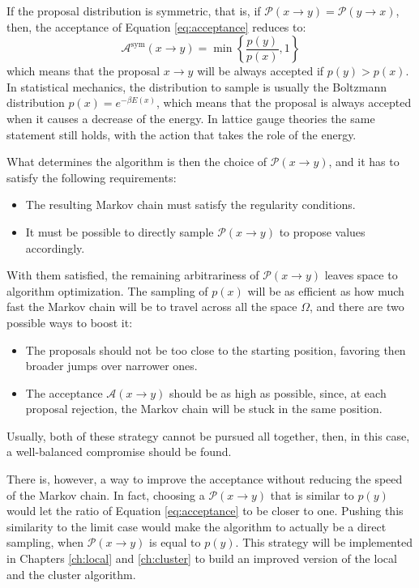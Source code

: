 If the proposal distribution is symmetric, that is, if $\mathcal P(x\to y) = \mathcal P(y\to x)$,
then, the acceptance of Equation \eqref{eq:acceptance} reduces to:
\begin{equation}\label{eq:acceptance_sym}
    \mathcal A^\mathrm{sym}(x\to y) = \min\left\{\frac{p(y)}{p(x)},1\right\}
\end{equation}
which means that the proposal $x\to y$ will be always accepted if $p(y) > p(x)$.
In statistical mechanics, the distribution to sample is usually the Boltzmann distribution $p(x) = e^{-\beta E(x)}$,
which means that the proposal is always accepted when it causes a decrease of the energy.
In lattice gauge theories the same statement still holds, with the action that takes the role of the energy.

What determines the algorithm is then the choice of $\mathcal P(x\to y)$,
and it has to satisfy the following requirements:
\begin{itemize}
    \item The resulting Markov chain must satisfy the regularity conditions.
    \item It must be possible to directly sample $\mathcal P(x\to y)$ to propose values accordingly.
\end{itemize}

With them satisfied, the remaining arbitrariness of $\mathcal P(x\to y)$ leaves space to algorithm optimization.
The sampling of $p(x)$ will be as efficient as how much fast the Markov chain will be to travel across all the space $\Omega$,
and there are two possible ways to boost it:
\begin{itemize}
    \item The proposals should not be too close to the starting position, favoring then broader jumps over narrower ones.
    \item The acceptance $\mathcal A(x\to y)$ should be as high as possible, since, at each proposal rejection,
        the Markov chain will be stuck in the same position.
\end{itemize}
Usually, both of these strategy cannot be pursued all together, then, in this case, a well-balanced compromise should be found.

There is, however, a way to improve the acceptance without reducing the speed of the Markov chain.
In fact, choosing a $\mathcal P(x\to y)$ that is similar to $p(y)$ would let the ratio of Equation \eqref{eq:acceptance} to be closer to one.
Pushing this similarity to the limit case would make the algorithm to actually be a direct sampling, when $\mathcal P(x\to y)$ is equal to $p(y)$.
This strategy will be implemented in Chapters \ref{ch:local} and \ref{ch:cluster} to build an improved version of the local and the cluster algorithm.

